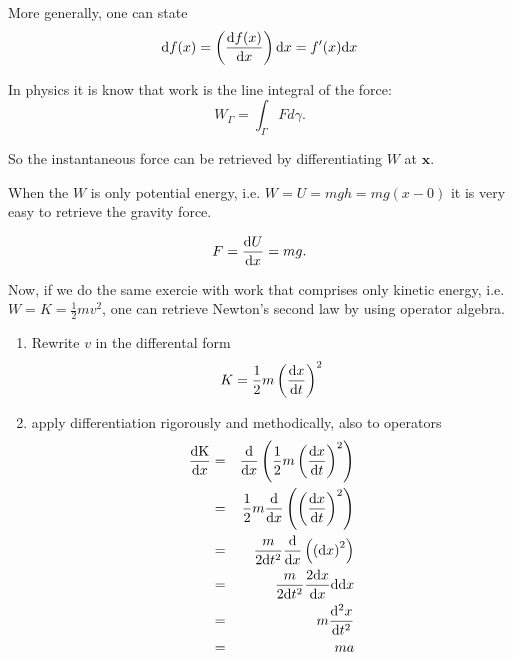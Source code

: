 More generally, one can state
\begin{equation}
	{\rm d}f(x) = \left(\frac{{\rm d}f(x)}{{\rm d}x}\right){\rm d}x=f'(x){\rm d}x
\end{equation}


\begin{myExample}
	In physics it is know that work is the line integral of the force:
	\begin{equation}
		W_\Gamma = \int_{\Gamma} Fd\gamma.
	\end{equation}
	
	So the instantaneous force can be retrieved by differentiating $W$ at $\mathbf{x}$.
	
	When the $W$ is only potential energy, i.e. $W=U=mgh = mg(x-0)$ it is very easy to retrieve the gravity force.
	
	\begin{equation}
		F = \frac{{\rm d} U}{{\rm d} x} = mg.
	\end{equation}
	
	
	Now, if we do the same exercie with work that comprises only kinetic energy, i.e. $W=K=\frac{1}{2}mv^2$, one can retrieve Newton's second law by using operator algebra.
	
	\begin{enumerate}
		\item Rewrite $v$ in the differental form
		\begin{equation}
			K = \frac{1}{2}m\left(\frac{{\rm d}x}{{\rm d} t}\right)^2
		\end{equation}
		
		\item apply differentiation rigorously and methodically, also to operators
		\begin{eqnarray}
			\frac{\rm d K}{{\rm d}x} 
			&=& \frac{\rm d}{{\rm d}x}\left(\frac{1}{2}m\left(\frac{{\rm d}x}{{\rm d}t}\right)^2\right)\\
			&=& \frac{1}{2}m\frac{\rm d}{{\rm d}x}\left(\left(\frac{{\rm d}x}{{\rm d}t}\right)^2\right)\\
			&=& \frac{m}{2{\rm d}t^2}\frac{\rm d}{{\rm d}x}\left(\left({\rm d}x\right)^2\right)\\
			&=& \frac{m}{2{\rm d}t^2}\frac{2{\rm d}x}{{\rm d}x}{\rm d}{\rm d}x\\
			&=& m \frac{{\rm d}^2x}{{\rm d}t^2}\\
			&=& ma
		\end{eqnarray}
	\end{enumerate}
\end{myExample}


